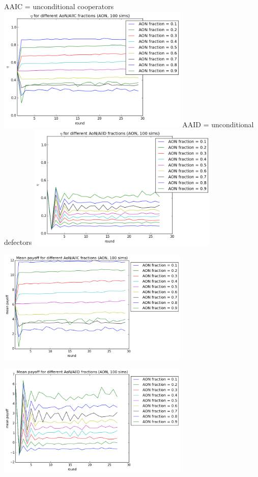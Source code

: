 \documentclass[letterpaper]{article}
\begin{document}
AAIC = unconditional cooperators
\includegraphics[width=3.6in,angle=0]{img/cfraction_AONAllCfractions_aon.png}
\label{fig6}
AAID = unconditional defectors
\includegraphics[width=3.6in,angle=0]{img/cfraction_AONAllDfractions_aon.png}
\label{fig7}


\includegraphics[width=3.6in,angle=0]{img/meanpayoff_AONAllCfractions_aon.png}
\label{fig8}

\includegraphics[width=3.6in,angle=0]{img/meanpayoff_AONAllDfractions_aon.png}
\label{fig9}
\end{document}
